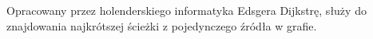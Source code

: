 \documentclass[preview]{standalone}
\begin{document}
\begin{center}
Opracowany przez holenderskiego informatyka Edsgera Dijkstr\k{e}, służy do znajdowania najkrótszej ścieżki z pojedynczego źródła w grafie.
\end{center}
\end{document}
